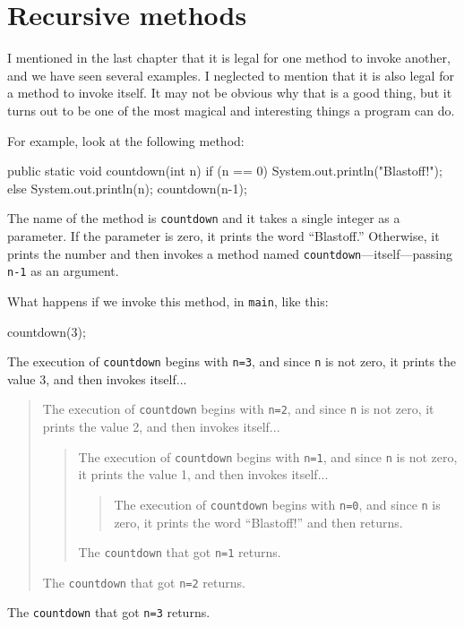 \documentclass[12pt]{book}
\begin{document}
\section{Recursive methods}
\label{recursion}


I mentioned in the last chapter that it is legal for one method to invoke another, and we have seen several examples.
I neglected to mention that it is also legal for a method to invoke itself.
It may not be obvious why that is a good thing, but it turns out to be one of the most magical and interesting things a program can do.

For example, look at the following method:

\begin{code}
    public static void countdown(int n) {
        if (n == 0) {
            System.out.println("Blastoff!");
        } else {
            System.out.println(n);
            countdown(n-1);
        }
    }
\end{code}

The name of the method is {\tt countdown} and it takes a single integer as a parameter.
If the parameter is zero, it prints the word ``Blastoff.''
Otherwise, it prints the number and then invokes a method named {\tt countdown}---itself---passing {\tt n-1} as an argument.

What happens if we invoke this method, in {\tt main}, like this:

\begin{code}
    countdown(3);
\end{code}

The execution of {\tt countdown} begins with {\tt n=3}, and since {\tt n} is not zero, it prints the value 3, and then invokes itself...
\begin{quote}
The execution of {\tt countdown} begins with {\tt n=2}, and since {\tt n} is not zero, it prints the value 2, and then invokes itself...
\begin{quote}
The execution of {\tt countdown} begins with {\tt n=1}, and since {\tt n} is not zero, it prints the value 1, and then invokes itself...
\begin{quote}
The execution of {\tt countdown} begins with {\tt n=0}, and since {\tt n} is zero, it prints the word ``Blastoff!'' and then returns.
\end{quote}
The {\tt countdown} that got {\tt n=1} returns.
\end{quote}
The {\tt countdown} that got {\tt n=2} returns.
\end{quote}
The {\tt countdown} that got {\tt n=3} returns.
\end{document}
